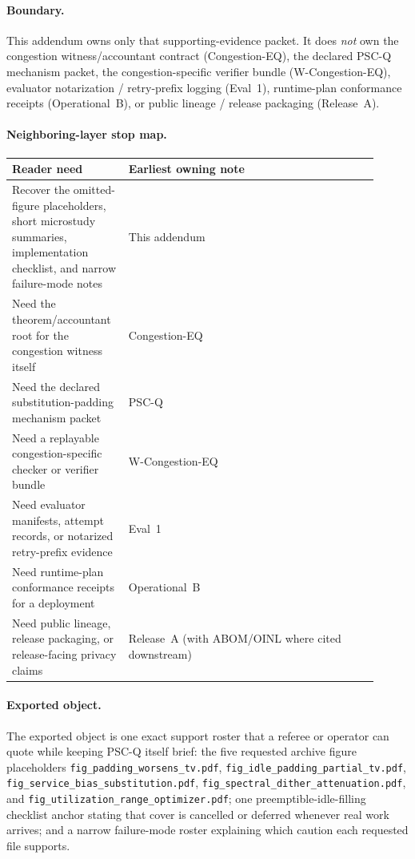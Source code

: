 \documentclass[11pt]{article}
\theoremstyle{definition}
\theoremstyle{remark}
\begin{document}
\paragraph{Boundary.}
This addendum owns only that supporting-evidence packet.
It does \emph{not} own the congestion witness/accountant contract (Congestion-EQ), the declared PSC-Q mechanism packet, the congestion-specific verifier bundle (W-Congestion-EQ), evaluator notarization / retry-prefix logging (Eval~1), runtime-plan conformance receipts (Operational~B), or public lineage / release packaging (Release~A).\cite{series:congeq,series:pscq,series:wcongeq,series:evalnotary,series:opb,series:releaseproperty}

\paragraph{Neighboring-layer stop map.}
\medskip
\noindent\begin{center}
\small
\begin{tabular}{p{0.27\linewidth}p{0.64\linewidth}}
\toprule
Reader need & Earliest owning note \\
\midrule
Recover the omitted-figure placeholders, short microstudy summaries, implementation checklist, and narrow failure-mode notes & This addendum \\
Need the theorem/accountant root for the congestion witness itself & Congestion-EQ \\
Need the declared substitution-padding mechanism packet & PSC-Q \\
Need a replayable congestion-specific checker or verifier bundle & W-Congestion-EQ \\
Need evaluator manifests, attempt records, or notarized retry-prefix evidence & Eval~1 \\
Need runtime-plan conformance receipts for a deployment & Operational~B \\
Need public lineage, release packaging, or release-facing privacy claims & Release~A (with ABOM/OINL where cited downstream) \\
\bottomrule
\end{tabular}
\end{center}

\paragraph{Exported object.}
The exported object is one exact support roster that a referee or operator can quote while keeping PSC-Q itself brief: the five requested archive figure placeholders \texttt{fig\_padding\_worsens\_tv.pdf}, \texttt{fig\_idle\_padding\_partial\_tv.pdf}, \texttt{fig\_service\_bias\_substitution.pdf}, \texttt{fig\_spectral\_dither\_attenuation.pdf}, and \texttt{fig\_utilization\_range\_optimizer.pdf}; one preemptible-idle-filling checklist anchor stating that cover is cancelled or deferred whenever real work arrives; and a narrow failure-mode roster explaining which caution each requested file supports.
\end{document}
